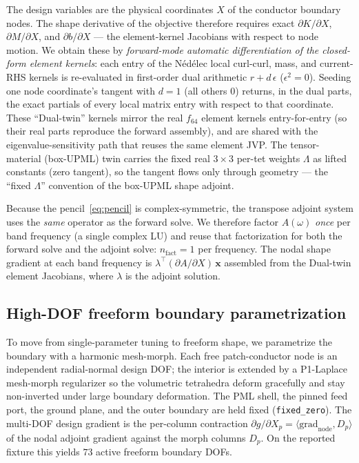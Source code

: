 \documentclass{anvil-paper}
\begin{document}
The design variables are the physical coordinates $X$ of the conductor boundary
nodes. The shape derivative of the objective therefore requires exact
$\partial K/\partial X$, $\partial M/\partial X$, and $\partial b/\partial X$
--- the element-kernel Jacobians with respect to node motion. We obtain these by
\emph{forward-mode automatic differentiation of the closed-form element
kernels}: each entry of the N\'ed\'elec local curl-curl, mass, and current-RHS
kernels is re-evaluated in first-order dual arithmetic $r+d\,\epsilon$
($\epsilon^2=0$). Seeding one node coordinate's tangent with $d=1$ (all others
$0$) returns, in the dual parts, the exact partials of every local matrix entry
with respect to that coordinate. These ``Dual-twin'' kernels mirror the real
$f_{64}$ element kernels entry-for-entry (so their real parts reproduce the
forward assembly), and are shared with the eigenvalue-sensitivity path that
reuses the same element JVP. The tensor-material (box-UPML) twin carries the
fixed real $3\times 3$ per-tet weights $\Lambda$ as lifted constants (zero
tangent), so the tangent flows only through geometry --- the ``fixed $\Lambda$''
convention of the box-UPML shape adjoint.

Because the pencil~\eqref{eq:pencil} is complex-symmetric, the transpose adjoint
system uses the \emph{same} operator as the forward solve. We therefore factor
$A(\omega)$ \emph{once} per band frequency (a single complex LU) and reuse that
factorization for both the forward solve and the adjoint solve:
$n_{\text{fact}}=1$ per frequency. The nodal shape gradient at each band
frequency is $\lambda^{\!\top}(\partial A/\partial X)\,\mathbf{x}$ assembled from
the Dual-twin element Jacobians, where $\lambda$ is the adjoint solution.

\subsection{High-DOF freeform boundary parametrization}
\label{sec:morph}

To move from single-parameter tuning to freeform shape, we parametrize the
boundary with a harmonic mesh-morph. Each free patch-conductor node is an
independent radial-normal design DOF; the interior is extended by a P1-Laplace
mesh-morph regularizer so the volumetric tetrahedra deform gracefully and stay
non-inverted under large boundary deformation. The PML shell, the pinned feed
port, the ground plane, and the outer boundary are held fixed
(\texttt{fixed\_zero}). The multi-DOF design gradient is the per-column
contraction $\partial g/\partial X_p = \langle \text{grad}_{\text{node}}, D_p\rangle$
of the nodal adjoint gradient against the morph columns $D_p$. On the reported
fixture this yields $73$ active freeform boundary DOFs.
\end{document}
